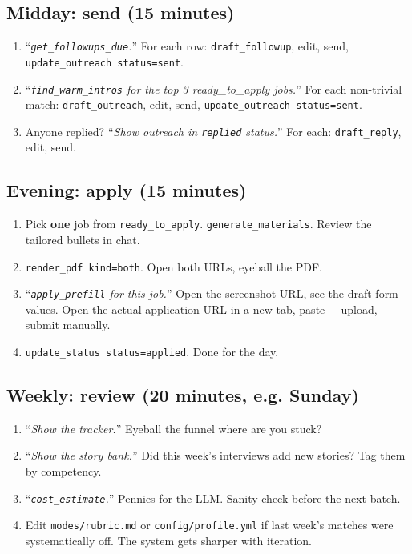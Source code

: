 \documentclass[11pt,letterpaper]{article}
\newcommand{\tool}[1]{\texttt{#1}}
\newcommand{\fpath}[1]{\texttt{#1}}
\begin{document}
\subsection*{Midday: send (15 minutes)}

\begin{enumerate}
\item ``\textit{\tool{get\_followups\_due}.}'' For each row: \tool{draft\_followup}, edit, send, \tool{update\_outreach status=sent}.
\item ``\textit{\tool{find\_warm\_intros} for the top 3 ready\_to\_apply jobs.}'' For each non-trivial match: \tool{draft\_outreach}, edit, send, \tool{update\_outreach status=sent}.
\item Anyone replied? ``\textit{Show outreach in \texttt{replied} status.}'' For each: \tool{draft\_reply}, edit, send.
\end{enumerate}

\subsection*{Evening: apply (15 minutes)}

\begin{enumerate}
\item Pick \textbf{one} job from \texttt{ready\_to\_apply}. \tool{generate\_materials}. Review the tailored bullets in chat.
\item \tool{render\_pdf kind=both}. Open both URLs, eyeball the PDF.
\item ``\textit{\tool{apply\_prefill} for this job.}'' Open the screenshot URL, see the draft form values. Open the actual application URL in a new tab, paste + upload, submit manually.
\item \tool{update\_status status=applied}. Done for the day.
\end{enumerate}

\subsection*{Weekly: review (20 minutes, e.g. Sunday)}

\begin{enumerate}
\item ``\textit{Show the tracker.}'' Eyeball the funnel \textemdash{} where are you stuck?
\item ``\textit{Show the story bank.}'' Did this week's interviews add new stories? Tag them by competency.
\item ``\textit{\tool{cost\_estimate}.}'' Pennies for the LLM. Sanity-check before the next batch.
\item Edit \fpath{modes/rubric.md} or \fpath{config/profile.yml} if last week's matches were systematically off. The system gets sharper with iteration.
\end{enumerate}
\end{document}
